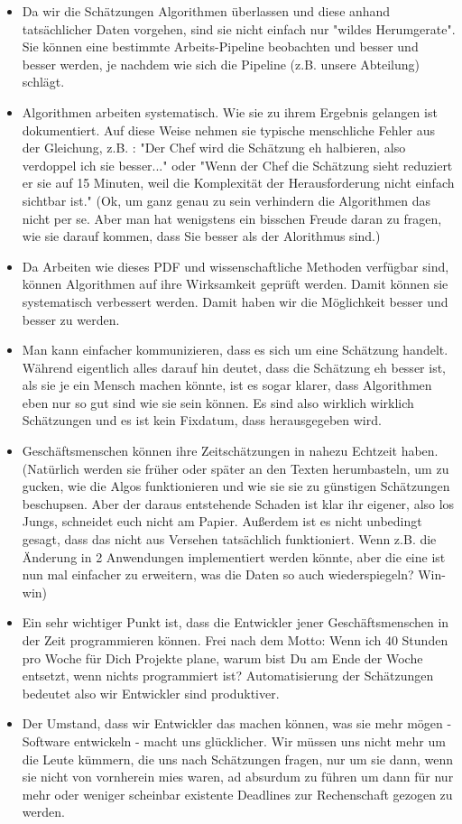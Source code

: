\begin{itemize}
\tightlist
\item
    Da wir die Schätzungen Algorithmen überlassen und diese anhand tatsächlicher Daten vorgehen, sind sie nicht einfach nur "wildes Herumgerate". Sie können eine bestimmte Arbeits-Pipeline beobachten und besser und besser werden, je nachdem wie sich die Pipeline (z.B. unsere Abteilung) schlägt.
\item
    Algorithmen arbeiten systematisch. Wie sie zu ihrem Ergebnis gelangen ist dokumentiert. Auf diese Weise nehmen sie typische menschliche Fehler aus der Gleichung, z.B. : "Der Chef wird die Schätzung eh halbieren, also verdoppel ich sie besser..." oder "Wenn der Chef die Schätzung sieht reduziert er sie auf 15 Minuten, weil die Komplexität der Herausforderung nicht einfach sichtbar ist." (Ok, um ganz genau zu sein verhindern die Algorithmen das nicht per se. Aber man hat wenigstens ein bisschen Freude daran zu fragen, wie sie darauf kommen, dass Sie besser als der Alorithmus sind.)
\item
  Da Arbeiten wie dieses PDF und wissenschaftliche Methoden verfügbar sind, können Algorithmen auf ihre Wirksamkeit geprüft werden. Damit können sie systematisch verbessert werden. Damit haben wir die Möglichkeit besser und besser zu werden.
\item
  Man kann einfacher kommunizieren, dass es sich um eine Schätzung handelt. Während eigentlich alles darauf hin deutet, dass die Schätzung eh besser ist, als sie je ein Mensch machen könnte, ist es sogar klarer, dass Algorithmen eben nur so gut sind wie sie sein können. Es sind also wirklich wirklich Schätzungen und es ist kein Fixdatum, dass herausgegeben wird.
\item
  Geschäftsmenschen können ihre Zeitschätzungen in nahezu Echtzeit haben. (Natürlich werden sie früher oder später an den Texten herumbasteln, um zu gucken, wie die Algos funktionieren und wie sie sie zu günstigen Schätzungen beschupsen. Aber der daraus entstehende Schaden ist klar ihr eigener, also los Jungs, schneidet euch nicht am Papier. Außerdem ist es nicht unbedingt gesagt, dass das nicht aus Versehen tatsächlich funktioniert. Wenn z.B. die Änderung in 2 Anwendungen implementiert werden könnte, aber die eine ist nun mal einfacher zu erweitern, was die Daten so auch wiederspiegeln? Win-win)
\item
  Ein sehr wichtiger Punkt ist, dass die Entwickler jener Geschäftsmenschen in der Zeit programmieren können. Frei nach dem Motto: Wenn ich 40 Stunden pro Woche für Dich Projekte plane, warum bist Du am Ende der Woche entsetzt, wenn nichts programmiert ist? Automatisierung der Schätzungen bedeutet also wir Entwickler sind produktiver.
\item
  Der Umstand, dass wir Entwickler das machen können, was sie mehr mögen - Software entwickeln - macht uns glücklicher. Wir müssen uns nicht mehr um die Leute kümmern, die uns nach  Schätzungen fragen, nur um sie dann, wenn sie nicht von vornherein mies waren, ad absurdum zu führen um dann für nur mehr oder weniger scheinbar existente Deadlines zur Rechenschaft gezogen zu werden.
\end{itemize}

